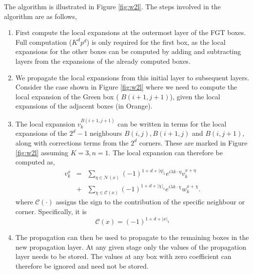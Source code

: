 The algorithm is illustrated in Figure \ref{fig:w2l}. The steps involved in the
algorithm are as follows, 
\begin{enumerate}    
  \item First compute the local expansions at the outermost layer of the FGT
    boxes. Full computation ($K^dp^d$) is only required for the first box, as
    the local expansions for the other boxes can be computed by adding and
    subtracting layers from the expansions of the already computed boxes. 
  
  \item We propagate the local expansions from this initial layer to subsequent
    layers. Consider the case shown in Figure \ref{fig:w2l} where we need to
    compute the local expansion of the Green box ( $B(i+1,j+1)$), given the
    local expansions of the adjacent boxes (in Orange).  
  
  \item The local expansion $v_k^{B(i+1, j+1)}$ can be written in terms for the
    local expansions of the $2^d -1$ neighbours $B(i,j), B(i+1,j)$ and
    $B(i,j+1)$, along with corrections terms from the $2^d$ corners.
    These are marked in Figure \ref{fig:w2l} assuming $K=3, n=1$. 
    The local expansion can therefore be computed as,
    \begin{eqnarray*} 
    v_k^x &=& \sum_{\eta \in \mathcal{N}(x)} (-1)^{1 + d + |\eta|_1} e^{i\lambda k\cdot\eta} v_k^{x+\eta} \\
    & +& \sum_{\chi \in \mathcal{C}(x)} (-1)^{1 + d + |\chi|_1} e^{i\lambda k\cdot\chi} w_k^{x+\chi}.
    \end{eqnarray*}
    where $\mathcal{C}(\cdot)$ assigns the sign to the contribution of the specific neighbour or corner. Specifically, it is 
    \[
      \mathcal{C}(x) = (-1)^{1+d+|x|_1}
    \]
    
  
  \item The propagation can then be used to propagate to the remaining boxes in
    the new propagation layer. At any given stage only the values of the
    propagation layer needs to be stored. The values at any box with zero
    coefficient can therefore be ignored and need not be stored.

\end{enumerate}


